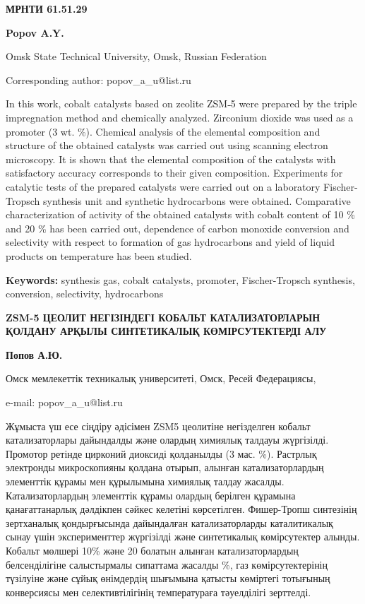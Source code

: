 \newpage
{\bfseries МРНТИ 61.51.29}


\begin{center}
{\bfseries Popov A.Y.}

Omsk State Technical University, Omsk, Russian Federation

Corresponding author: popov\_a\_u@list.ru
\end{center}

In this work, cobalt catalysts based on zeolite ZSM˗5 were prepared by
the triple impregnation method and chemically analyzed. Zirconium
dioxide was used as a promoter (3 wt. \%). Chemical analysis of the
elemental composition and structure of the obtained catalysts was
carried out using scanning electron microscopy. It is shown that the
elemental composition of the catalysts with satisfactory accuracy
corresponds to their given composition. Experiments for catalytic tests
of the prepared catalysts were carried out on a laboratory
Fischer-Tropsch synthesis unit and synthetic hydrocarbons were obtained.
Comparative characterization of activity of the obtained catalysts with
cobalt content of 10 \% and 20 \% has been carried out, dependence of
carbon monoxide conversion and selectivity with respect to formation of
gas hydrocarbons and yield of liquid products on temperature has been
studied.

{\bfseries Keywords:} synthesis gas, cobalt catalysts, promoter,
Fischer-Tropsch synthesis, conversion, selectivity, hydrocarbons

\begin{center}
{\large\bfseries ZSM-5 ЦЕОЛИТ НЕГІЗІНДЕГІ КОБАЛЬТ КАТАЛИЗАТОРЛАРЫН ҚОЛДАНУ АРҚЫЛЫ СИНТЕТИКАЛЫҚ КӨМІРСУТЕКТЕРДІ АЛУ}

{\bfseries Попов А.Ю.}

Омск мемлекеттік техникалық университеті, Омск, Ресей Федерациясы,

e-mail: popov\_a\_u@list.ru
\end{center}

Жұмыста үш есе сіңдіру әдісімен ZSM5 цеолитіне негізделген кобальт
катализаторлары дайындалды және олардың химиялық талдауы жүргізілді.
Промотор ретінде цирконий диоксиді қолданылды (3 мас. \%). Растрлық
электронды микроскопияны қолдана отырып, алынған катализаторлардың
элементтік құрамы мен құрылымына химиялық талдау жасалды.
Катализаторлардың элементтік құрамы олардың берілген құрамына
қанағаттанарлық дәлдікпен сәйкес келетіні көрсетілген. Фишер-Тропш
синтезінің зертханалық қондырғысында дайындалған катализаторларды
каталитикалық сынау үшін эксперименттер жүргізілді және синтетикалық
көмірсутектер алынды. Кобальт мөлшері 10\% және 20 болатын алынған
катализаторлардың белсенділігіне салыстырмалы сипаттама жасалды \%, газ
көмірсутектерінің түзілуіне және сұйық өнімдердің шығымына қатысты
көміртегі тотығының конверсиясы мен селективтілігінің температураға
тәуелділігі зерттелді.

